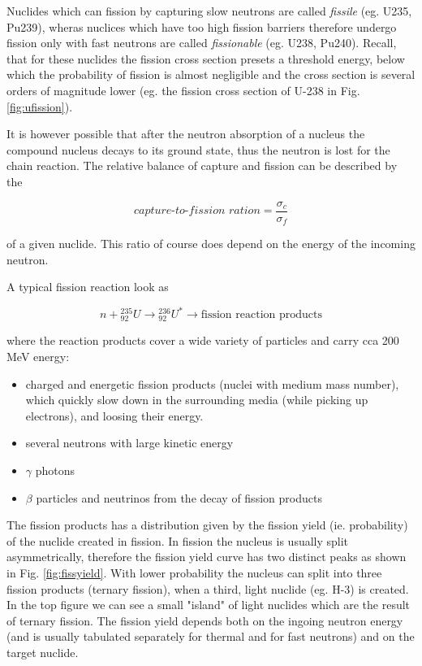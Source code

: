 Nuclides which can fission by capturing slow neutrons are called \textit{fissile} (eg. U235, Pu239), wheras nuclices which have too high fission barriers therefore undergo fission only with fast neutrons are called \textit{fissionable} (eg. U238, Pu240). Recall, that for these nuclides the fission cross section presets a threshold energy, below which the probability of fission is almost negligible and the cross section is several orders of magnitude lower (eg. the fission cross section of U-238 in Fig. \ref{fig:ufission}).

It is however possible that after the neutron absorption of a nucleus the compound nucleus decays to its ground state, thus the neutron is lost for the chain reaction. The relative balance of capture and fission can be described by the 

\begin{equation}
\textit{capture-to-fission ration}=\frac{\sigma_c}{\sigma_f}
\end{equation}

of a given nuclide. This ratio of course does depend on the energy of the incoming neutron.

A typical fission reaction look as 

\[
n+{}_{92}^{235}U\rightarrow {}_{92}^{236}U^* \rightarrow \text{fission reaction products}
\]

where the reaction products cover a wide variety of particles and carry cca 200 MeV energy:

\begin{itemize}
\item charged and energetic fission products (nuclei with medium mass number), which quickly slow down in the surrounding media (while picking up electrons), and loosing their energy.
\item several neutrons with large kinetic energy
\item $\gamma$ photons
\item $\beta$ particles and neutrinos from the decay of fission products
\end{itemize}

The fission products has a distribution given by the fission yield (ie. probability) of the nuclide created in fission. In fission the nucleus is usually split asymmetrically, therefore the fission yield curve has two distinct peaks as shown in Fig. \ref{fig:fissyield}. With lower probability the nucleus can split into three fission products (ternary fission), when a third, light nuclide (eg. H-3) is created. In the top figure we can see a small "island" of light nuclides which are the result of ternary fission. The fission yield depends both on the ingoing neutron energy (and is usually tabulated separately for thermal and for fast neutrons) and on the target nuclide.


